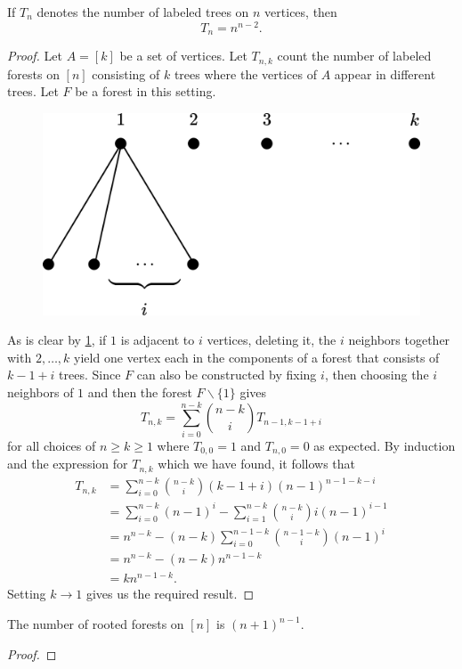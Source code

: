 \begin{theorem}
If $T_n$ denotes the number of labeled trees on $n$ vertices, then
    \[
    T_n = n^{n-2}.
    \]
    \label{t:Cayley's Formula}
\end{theorem}
\begin{proof}
Let $A=[k]$ be a set of vertices. Let $T_{n,k}$ count the number of labeled forests on $[n]$ consisting of $k$ trees where the vertices of $A$ appear in different trees. Let $F$ be a forest in this setting.
\begin{figure}[H]
    \centering
    \includegraphics[width=0.5\linewidth]{Images/Figure30.png}
    \caption{}
    \label{f:CTProof}
\end{figure}
As is clear by \cref{f:CTProof}, if $1$ is adjacent to $i$ vertices, deleting it, the $i$ neighbors together with $2,\ldots,k$ yield one vertex each in the components of a forest that consists of $k-1+i$ trees. Since $F$ can also be constructed by fixing $i$, then choosing the $i$ neighbors of $1$ and then the forest $F\backslash \{1\}$ gives \[
T_{n,k} = \sum_{i=0}^{n-k}\binom{n-k}{i}T_{n-1,k-1+i}
\]
for all choices of $n\geq k\geq 1$ where $T_{0,0}=1$ and $T_{n,0}=0$ as expected. By induction and the expression for $T_{n,k}$ which we have found, it follows that
\begin{align*}
    T_{n,k}&= \sum_{i=0}^{n-k}\binom{n-k}{i}(k-1+i)(n-1)^{n-1-k-i} \\
    &= \sum_{i=0}^{n-k}(n-1)^i-\sum_{i=1}^{n-k}\binom{n-k}{i}i(n-1)^{i-1} \\
    &= n^{n-k}-(n-k)\sum_{i=0}^{n-1-k}\binom{n-1-k}{i}(n-1)^i \\
    &= n^{n-k}-(n-k)n^{n-1-k} \\
    &= kn^{n-1-k}.
\end{align*}
Setting $k\to 1$ gives us the required result.
\end{proof}
\begin{theorem}
The number of rooted forests on $[n]$ is $(n+1)^{n-1}$.
\end{theorem}
\begin{proof}

\end{proof}
